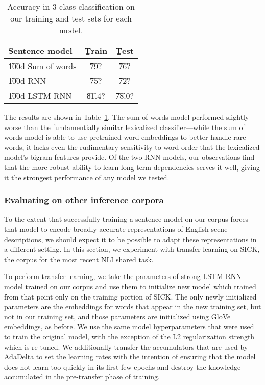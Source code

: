 \begin{table}
\begin{center}
\begin{tabular}{l@{\hskip \colspaceL}@{\hskip \colspaceL}c@{\hskip \colspaceL}c}
\hline
\textbf{Sentence model} & \b{Train}  & \b{Test}\\
\hline
\t{100d Sum of words}            & \t{79?} & \t{76?} \\
\t{100d RNN}            & \t{75?} & \t{72?} \\	
\t{100d LSTM RNN}            & \t{81.4?} & \t{78.0?} \\
\hline
\end{tabular}
\end{center}
\caption{
\label{tab:nnresults}
Accuracy in 3-class classification on our training and test sets for each model.
}
\end{table}

The results are shown in Table~\ref{tab:nnresults}. The sum of words model performed slightly worse than the fundamentially similar lexicalized classifier---while the sum of words model is able to use pretrained word embeddings to better handle rare words, it lacks even the rudimentary sensitivity to word order that the lexicalized model's bigram features provide. Of the two RNN models, our observations find that the more robust ability to learn long-term dependencies serves it well, giving it the strongest performance of any model we tested.

\subsubsection{Evaluating on other inference corpora}

To the extent that successfully training a sentence model on our corpus forces that model to encode broadly accurate representations of English scene descriptions, we should expect it to be possible to adapt these representations in a different setting. In this section, we experiment with transfer learning on SICK, the corpus for the most recent NLI shared task.

To perform transfer learning, we take the parameters of strong LSTM RNN model trained on our corpus and use them to initialize new model which trained from that point only on the training portion of SICK. The only newly initialized parameters are the embeddings for words that appear in the new training set, but not in our training set, and those parameters are initialized using GloVe embeddings, as before. We use the same model hyperparameters that were used to train the original model, with the exception of the L2 regularization strength which is re-tuned. We additionally transfer the accumulators that are used by AdaDelta to set the learning rates with the intention of ensuring that the model does not learn too quickly in its first few epochs and destroy the knowledge accumulated in the pre-transfer phase of training.

